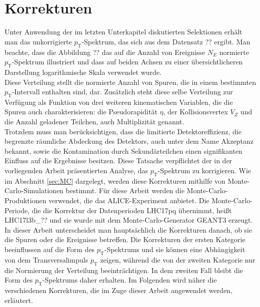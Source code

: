 \documentclass[12pt,a4paper]{report}
\begin{document}
\section{Korrekturen}
\label{Korr}
Unter Anwendung der im letzten Unterkapitel diskutierten Selektionen erhält man das unkorrigierte $p_{\mathrm{T}}$-Spektrum, das sich aus dem Datensatz ?? ergibt. Man beachte, dass die Abbildung ?? das auf die Anzahl von Ereignisse $N_{E}$ normierte $p_{\mathrm{T}}$-Spektrum illustriert und dass auf beiden Achsen zu einer übersichtlicheren Darstellung logarithmische Skala verwendet wurde.\\
Diese Verteilung stellt die normierte Anzahl von Spuren, die in einem bestimmten $p_{\mathrm{T}}$-Intervall enthalten sind, dar. Zusätzlich steht diese selbe Verteilung zur Verfügung als Funktion von drei weiteren kinematischen Variablen, die die Spuren auch charakterisieren: die Pseudorapidität $\eta$, der Kollisionsvertex $V_{Z}$ und die Anzahl geladener Teilchen, auch Multiplizität genannt.\\
Trotzdem muss man berücksichtigen, dass die limitierte Detektoreffizienz, die begrenzte räumliche Abdeckung des Detektors, auch unter dem Name Akzeptanz bekannt, sowie die Kontamination durch Sekundärteilchen einen signifikanten Einfluss auf die Ergebnisse besitzen. Diese Tatsache verpflichtet der in der vorliegenden Arbeit präsentierten Analyse, das $p_{\mathrm{T}}$-Spektrum zu korrigieren. Wie im Abschnitt \ref{sec:MC} dargelegt, werden diese Korrekturen mithilfe von Monte-Carlo-Simulationen bestimmt. Für diese Arbeit werden die Monte-Carlo-Produktionen verwendet, die das ALICE-Experiment anbietet. Die Monte-Carlo-Periode, die die Korrektur der Datenperioden LHC17pq übernimmt, heißt LHC17l3b\_?? und sie wurde mit dem Monte-Carlo-Generator GEANT3 erzeugt.\\
In dieser Arbeit unterscheidet man hauptsächlich die Korrekturen danach, ob sie die Spuren oder die Ereignisse betreffen. Die Korrekturen der ersten Kategorie beeinflussen auf die Form des $p_{\mathrm{T}}$-Spektrums und sie können eine Abhängigkeit von dem Transversalimpuls $p_{\mathrm{T}}$ zeigen, während die von der zweiten Kategorie nur die Normierung der Verteilung beeinträchtigen. In dem zweiten Fall bleibt die Form des $p_{\mathrm{T}}$-Spektrums daher erhalten. Im Folgenden wird näher die verschiedenen Korrekturen, die im Zuge dieser Arbeit angewendet werden, erläutert. 
\end{document}
